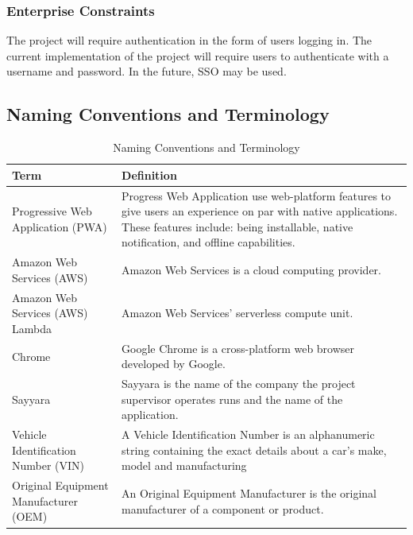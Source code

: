 \documentclass[12pt]{article}
\begin{document}
\subsubsection{Enterprise Constraints}
The project will require authentication in the form of users logging in. The current implementation
of the project will require users to authenticate with a username and password. In the future, SSO
may be used.

\subsection{Naming Conventions and Terminology}
\begin{table}[H]
	\caption{Naming Conventions and Terminology}
	\centering
	\begin{tabular}{ |p{5cm}|p{10.5cm}|  }
		\hline
		\textbf{Term}                         & \textbf{Definition}                                                      \\
		\hline
		Progressive Web Application (PWA)     & Progress Web Application use web-platform features to give
		users an experience on par with native applications. These features include: being installable,
		native notification, and offline capabilities.                                                                   \\
		\hline
		Amazon Web Services (AWS)             & Amazon Web Services is a cloud computing provider.                       \\
		\hline
		Amazon Web Services (AWS) Lambda      & Amazon Web Services' serverless compute unit.                            \\
		\hline
		Chrome                                & Google Chrome is a cross-platform web browser developed by Google.       \\
		\hline
		Sayyara                               & Sayyara is the name of the company the project
		supervisor operates runs and the name of the application.                                                        \\
		\hline
		Vehicle Identification Number (VIN)   & A Vehicle Identification Number is an alphanumeric string
		containing the exact details about a car's make, model and manufacturing                                         \\
		\hline
		Original Equipment Manufacturer (OEM) & An Original Equipment Manufacturer is the original
		manufacturer of a component or product.                                                                          \\

\end{tabular}
\end{table}
\end{document}
